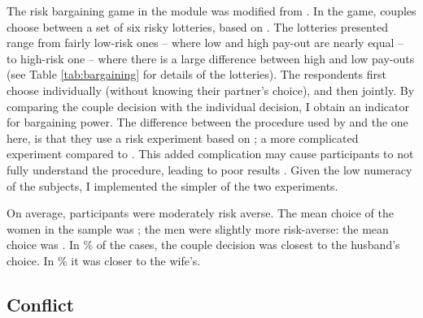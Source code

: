 \documentclass[11pt,a4paper]{scrartcl} %
\begin{document}
The risk bargaining game in the module was modified from \cite{Martinsson2009}. In the game, couples choose between a set of six risky lotteries, based on \cite{Eckel2002}. The lotteries presented range from fairly low-risk ones -- where low and high pay-out are nearly equal -- to high-risk one -- where there is a large difference between high and low pay-outs (see Table \ref{tab:bargaining} for details of the lotteries). The respondents first choose individually (without knowing their partner's choice), and then jointly. By comparing the couple decision with the individual decision, I obtain an indicator for bargaining power. The difference between the procedure used by \cite{Martinsson2009} and the one here, is that they use a risk experiment based on \cite{Holt2002}; a more complicated experiment compared to \citeauthor{Eckel2002}. This added complication may cause participants to not fully understand the procedure, leading to poor results \citep{Dave2010a}. Given the low numeracy of the subjects, I implemented the simpler of the two experiments.

On average, participants were moderately risk averse. The mean choice of the women in the sample was ; the men were slightly more risk-averse:  the mean choice was . In \% of the cases, the couple decision was closest to the husband's choice. In \% it was closer to the wife's.



\subsection*{Conflict}
\end{document}
